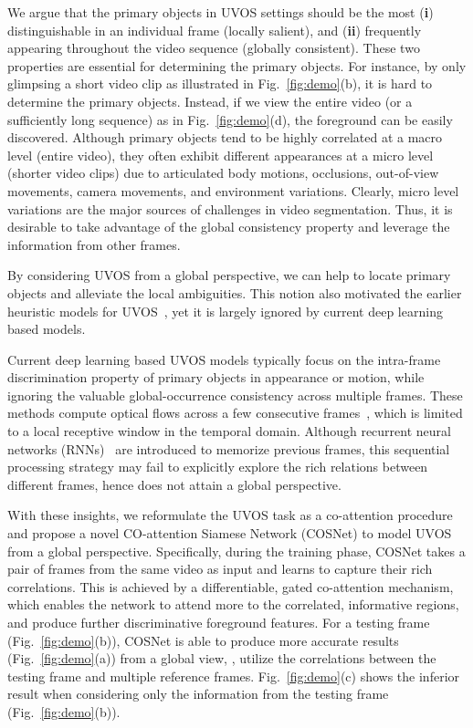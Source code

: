 \documentclass[10pt,twocolumn,letterpaper]{article}
\begin{document}
We argue that the primary objects in UVOS settings should be the most (\textbf{i}) distinguishable in an individual frame (locally salient), and (\textbf{ii}) frequently appearing throughout the video sequence (globally consistent). These two properties are essential for determining the primary objects. For instance, by only glimpsing a short video clip as illustrated in Fig.~\ref{fig:demo}(b), it is hard to determine the primary objects. Instead, if we view the entire video (or a sufficiently long sequence) as in Fig.~\ref{fig:demo}(d), the foreground can be easily discovered. Although primary objects tend to be highly correlated at a macro level (entire video), they often exhibit different appearances at a micro level (shorter video clips) due to articulated body motions, occlusions, out-of-view movements, camera movements, and environment variations. Clearly, micro level variations are the major sources of challenges in video segmentation. Thus, it is desirable to take advantage of the global consistency property and leverage the information from other frames.

By considering UVOS from a global perspective, we can help to locate primary objects and alleviate the local ambiguities. This notion also motivated the earlier heuristic models for UVOS~\cite{DBLP:conf/bmvc/FaktorI14}, yet it is largely ignored by current deep learning based models.





Current deep learning based UVOS models typically focus on the intra-frame discrimination property of primary objects in appearance or motion, while ignoring the valuable global-occurrence consistency across multiple frames. These methods compute optical flows across a few consecutive frames~\cite{DBLP:conf/iccv/TokmakovAS17,jain2017fusionseg,cheng2017segflow,Li_2018_CVPR,Li_2018_ECCV1}, which is limited to a local receptive window in the temporal domain. Although recurrent neural networks (RNNs)~\cite{Song_2018_ECCV} are introduced to memorize previous frames, this sequential processing strategy may fail to explicitly explore the rich relations between different frames, hence does not attain a global perspective.




With these insights, we reformulate the UVOS task as a co-attention procedure and propose a novel CO-attention Siamese Network (COSNet) to model UVOS from a global perspective.
Specifically, during the training phase, COSNet takes a pair of frames from the same video as input and learns to capture their rich correlations. This is achieved by a differentiable, gated co-attention mechanism, which enables the network to attend more to the correlated, informative regions, and produce further discriminative foreground features. For a testing frame (Fig.~\ref{fig:demo}(b)), COSNet is able to produce more accurate results (Fig.~\ref{fig:demo}(a)) from a global view, \ie, utilize the correlations between the testing frame and multiple reference frames. Fig.~\ref{fig:demo}(c) shows the inferior result when considering only the information from the testing frame (Fig.~\ref{fig:demo}(b)).
\end{document}
